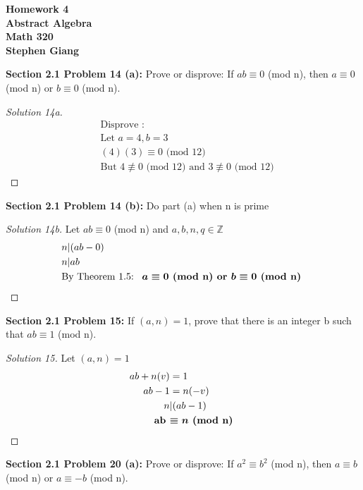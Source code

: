 \documentclass[12pt]{article}
\begin{document}
	
	\begin{center}
		\textbf{Homework 4} \\
		\textbf{Abstract Algebra} \\
		\textbf{Math 320} \\
		\textbf{Stephen Giang} \\
	\end{center}

\noindent \textbf{Section 2.1 Problem 14 (a): } Prove or disprove: If $ab \equiv 0$ (mod n), then $a \equiv 0$ (mod n) or $b \equiv 0$ (mod n). 
	\begin{proof}[Solution 14a] 
		\begin{align*}
			&\text{Disprove :} \\
			&\text{Let } a = 4, b = 3 \\
			&(4)(3) \equiv  0 \text{ (mod 12)} \\
			&\text{But } 4 \not \equiv 0 \text{ (mod 12) and } 3 \not \equiv 0 \text{ (mod 12)}
		\end{align*}
	\end{proof}
\vspace{\baselineskip}
\noindent \textbf{Section 2.1 Problem 14 (b): } Do part (a) when n is prime
	\begin{proof}[Solution 14b]
		\quad Let $ab \equiv 0$ (mod n) and $a,b,n,q \in \mathbb{Z}$
		\begin{align*}
			&n | (ab- 0) \\
			&n | ab		\\
			&\text{By Theorem 1.5: } \textbf{ \boldmath$a \equiv 0 $ (mod n) or $ b \equiv 0 $ (mod n) } 
		\end{align*}
	\end{proof}
\vspace{\baselineskip}
\noindent \textbf{Section 2.1 Problem 15: } If $(a, n) = 1$, prove that there is an integer b such that $ab \equiv 1$ (mod n).
	\begin{proof}[Solution 15] 
		Let $(a,n) = 1$
		\begin{align*}
			ab + n(v) &= 1 \\
			ab - 1 &= n(-v) \\
			n &| (ab - 1) \\
			\textbf{ab } &\textbf{\boldmath $ \equiv n \text{ (mod n) }$}
		\end{align*}
	\end{proof} 
\newpage
\noindent \textbf{Section 2.1 Problem 20 (a): } Prove or disprove: If $a^2 \equiv b^2$ (mod n), then $a \equiv b$ (mod n) or
$a \equiv -b$ (mod n). 
\end{document}
